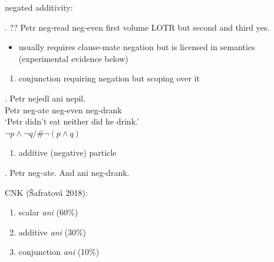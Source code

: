 \documentclass[ignorenonframetext,]{beamer}
\providecommand{\tightlist}{%
  \setlength{\itemsep}{0pt}\setlength{\parskip}{0pt}}
\begin{document}
\begin{frame}

negated additivity:

\ex. ?? Petr neg-read neg-even first volume LOTR but second and third
yes.

\begin{itemize}
\tightlist
\item
  usually requires clause-mate negation but is licensed in semantics
  (experimental evidence below)
\end{itemize}

\end{frame}

\begin{frame}

\begin{enumerate}
\def\labelenumi{\arabic{enumi})}
\setcounter{enumi}{1}
\tightlist
\item
  conjunction requiring negation but scoping over it
\end{enumerate}

\exg. Petr nejedl ani nepil.\\
Petr neg-ate neg-even neg-drank\\
`Petr didn't eat neither did he drink.'\\
\(\neg p \wedge \neg q/\# \neg(p \wedge q)\)

\begin{enumerate}
\def\labelenumi{\arabic{enumi})}
\setcounter{enumi}{2}
\tightlist
\item
  additive (negative) particle
\end{enumerate}

\ex. Petr neg-ate. And ani neg-drank.

\end{frame}

\begin{frame}

CNK (Šafratová 2018):

\begin{enumerate}
\def\labelenumi{\arabic{enumi})}
\item
  scalar \emph{ani} (60\%)
\item
  additive \emph{ani} (30\%)
\item
  conjunction \emph{ani} (10\%)
\end{enumerate}

\end{frame}
\end{document}
